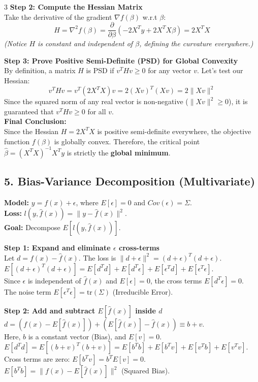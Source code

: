 \documentclass[10pt,landscape]{article}
\begin{document}
\begin{multicols*}{3}
\textbf{Step 2: Compute the Hessian Matrix} \\
Take the derivative of the gradient $\nabla f(\beta)$ w.r.t $\beta$:
$$H = \nabla^2 f(\beta) = \frac{\partial}{\partial \beta} (-2X^Ty + 2X^TX\beta) = 2X^TX$$
\textit{(Notice $H$ is constant and independent of $\beta$, defining the curvature everywhere.)}

\textbf{Step 3: Prove Positive Semi-Definite (PSD) for Global Convexity} \\
By definition, a matrix $H$ is PSD if $v^T H v \ge 0$ for any vector $v$. Let's test our Hessian:
$$v^T H v = v^T (2X^TX) v = 2(Xv)^T(Xv) = 2\|Xv\|^2$$
Since the squared norm of any real vector is non-negative ($\|Xv\|^2 \ge 0$), it is guaranteed that $v^T H v \ge 0$ for all $v$. \\

\textbf{Final Conclusion:} \\
Since the Hessian $H = 2X^TX$ is positive semi-definite everywhere, the objective function $f(\beta)$ is globally convex. Therefore, the critical point $\hat{\beta} = (X^TX)^{-1}X^Ty$ is strictly the \textbf{global minimum}.

\subsection*{5. Bias-Variance Decomposition (Multivariate)}
\textbf{Model:} $y = f(x) + \epsilon$, where $E[\epsilon] = 0$ and $Cov(\epsilon) = \Sigma$. \\
\textbf{Loss:} $l(y, \hat{f}(x)) = \|y - \hat{f}(x)\|^2$. \\
\textbf{Goal:} Decompose $E[l(y, \hat{f}(x))]$.

\textbf{Step 1: Expand and eliminate $\epsilon$ cross-terms} \\
Let $d = f(x) - \hat{f}(x)$. The loss is $\|d + \epsilon\|^2 = (d+\epsilon)^T(d+\epsilon)$. \\
$E[(d+\epsilon)^T(d+\epsilon)] = E[d^Td] + E[d^T\epsilon] + E[\epsilon^Td] + E[\epsilon^T\epsilon]$. \\
Since $\epsilon$ is independent of $\hat{f}(x)$ and $E[\epsilon]=0$, the cross terms $E[d^T\epsilon] = 0$. \\
The noise term $E[\epsilon^T\epsilon] = \text{tr}(\Sigma)$ (Irreducible Error).

\textbf{Step 2: Add and subtract $E[\hat{f}(x)]$ inside $d$} \\
$d = (f(x) - E[\hat{f}(x)]) + (E[\hat{f}(x)] - \hat{f}(x)) \equiv b + v$. \\
Here, $b$ is a constant vector (Bias), and $E[v] = 0$. \\
$E[d^Td] = E[(b+v)^T(b+v)] = E[b^Tb] + E[b^Tv] + E[v^Tb] + E[v^Tv]$. \\
Cross terms are zero: $E[b^Tv] = b^TE[v] = 0$. \\
$E[b^Tb] = \|f(x) - E[\hat{f}(x)]\|^2$ (Squared Bias).


\end{multicols*}
\end{document}

